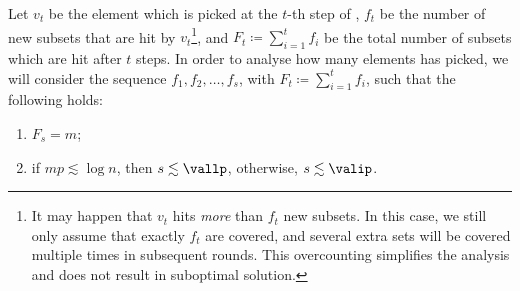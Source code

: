 Let \(v_t\) be the element which is picked at the \(t\)-th step of \bgreedy, \(f_t\) be the number of new subsets that are hit by \(v_t\)\footnote{It may happen that \(v_t\) hits \emph{more} than \(f_t\) new subsets. In this case, we still only assume that exactly \(f_t\) are covered, and several extra sets will be covered multiple times in subsequent rounds. This overcounting simplifies the analysis and does not result in suboptimal solution.},
and \(F_t \coloneqq \sum_{i = 1}^t f_i\) be the total number of subsets which are hit after \(t\) steps.
In order to analyse how many elements \bgreedy has picked, we will consider the sequence 
\(f_1, f_2, \ldots, f_s\), with \(F_t \coloneqq \sum_{i = 1}^t f_i\), such that the following holds:
\begin{enumerate}
    \item \(F_s = m\);
    \item if \(mp \lesssim \log n\), then \(s \lesssim \vallp\), otherwise, \(s \lesssim \valip\).
\end{enumerate}

